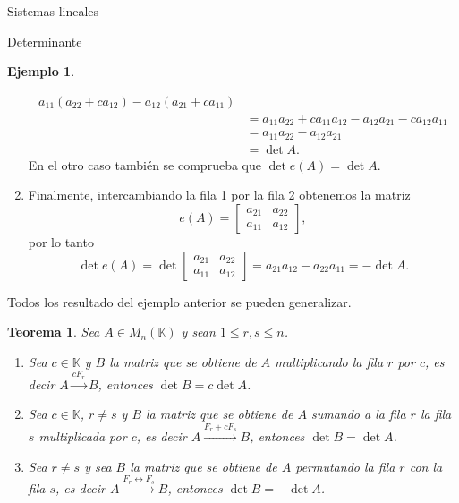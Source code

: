 \documentclass[a4paper,12pt,twoside,spanish,reqno]{amsbook}
\newtheorem{teorema}{Teorema}[section]
\theoremstyle{definition}
\newtheorem{ejemplo}{Ejemplo}[section]
\theoremstyle{remark}
\newcommand{\K}{\mathbb K}
\begin{document}
\begin{chapter}{Sistemas lineales}
\begin{section}{Determinante}
\begin{ejemplo}
\begin{enumerate}
\begin{align*}
                a_{11}(a_{22}+ ca_{12})- a_{12}( a_{21}+ ca_{11}) \\
                &= a_{11}a_{22}+ ca_{11}a_{12}- a_{12} a_{21}- ca_{12} a_{11}\\
                &= a_{11}a_{22}- a_{12} a_{21} \\
                &= \det A.
            \end{align*}
            En  el otro caso también se comprueba que $\det e(A) = \det A$. 
            \item Finalmente, intercambiando la fila 1 por la fila 2 obtenemos la matriz
            \begin{equation*}
            e(A)=\begin{bmatrix} a_{21}& a_{22}\\ a_{11}&a_{12}\end{bmatrix},
            \end{equation*}
            por lo tanto 
            \begin{equation*}
            \det e(A)= \det \begin{bmatrix} a_{21}& a_{22}\\ a_{11}&a_{12}\end{bmatrix} = a_{21}a_{12} - a_{22}a_{11} = -\det A.
            \end{equation*}
        \end{enumerate}
    \end{ejemplo}
    
    Todos los resultado del ejemplo anterior se pueden generalizar. 
    
    \begin{teorema} \label{det-prop-fundamentales}
        Sea $A  \in M_n(\K)$ y sean $1 \le r,s \le n$.
        \begin{enumerate}
            \item Sea $c \in \K$ y $B$ la matriz que se obtiene de $A$ multiplicando la fila $r$ por $c$, es decir $A  \stackrel{cF_r}{\longrightarrow} B$, entonces $\det B = c \det A$.
            \item  Sea $c \in \K$, $r \ne s$ y $B$ la matriz que se obtiene de $A$ sumando a la fila $r$ la fila $s$ multiplicada por $c$, es decir  $A  \stackrel{F_r + cF_s}{\longrightarrow} B$, entonces $\det B = \det A$.
            \item Sea $r \ne s$ y sea $B$ la matriz que se obtiene de $A$ permutando la fila $r$ con la fila $s$, es decir  $A  \stackrel{F_r \leftrightarrow F_s}{\longrightarrow}B$, entonces $\det B = -\det A$.
            

\end{enumerate}
\end{teorema}
\end{section}
\end{chapter}
\end{document}
